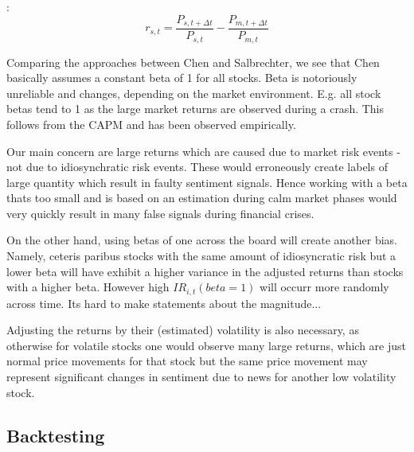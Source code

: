 \documentclass[12pt,a4paper]{article}
\begin{document}
	\cite{chen_stock_2021}:
	$$
	r_{s, t}=\frac{P_{s, t+\Delta t}}{P_{s, t}}-\frac{P_{m, t+\Delta t}}{P_{m, t}}
	$$
	
	Comparing the approaches between Chen and Salbrechter, we see that Chen basically assumes a constant beta of 1 for all stocks. 
	Beta is notoriously unreliable and changes, depending on the market environment.
	E.g. all stock betas tend to 1 as the large market returns are observed during a crash.
	This follows from the CAPM and has been observed empirically.
	
	Our main concern are large returns which are caused due to market risk events - not due to idiosynchratic risk events.
	These would erroneously create labels of large quantity which result in faulty sentiment signals.
	Hence working with a beta thats too small and is based on an estimation during calm market phases would very quickly result in many false signals during financial crises.
	
	On the other hand, using betas of one across the board will create another bias.
	Namely, ceteris paribus stocks with the same amount of idiosyncratic risk but a lower beta will have exhibit a higher variance in the adjusted returns than stocks with a higher beta.
	However high $IR_{i,t}(beta=1)$ will occurr more randomly across time.
	Its hard to make statements about the magnitude...
	
	Adjusting the returns by their (estimated) volatility is also necessary, as otherwise for volatile stocks
	one would observe many large returns, which are just normal price movements for that stock but the same price movement may represent significant changes in sentiment due to news for another low volatility stock.
	
	
	
	\subsection{Backtesting}
	
	
	
	
	
	
\end{document}
